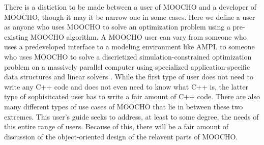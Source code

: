 \documentclass[pdf,ps2pdf,11pt]{SANDreport}
\begin{document}
There is a distiction to be made between a user of MOOCHO and a developer of
MOOCHO, though it may it be narrow one in some cases.  Here we define a user
as anyone who uses MOOCHO to solve an optimization problem using a
pre-existing MOOCHO algorithm.  A MOOCHO user can vary from someone who uses a
predeveloped interface to a modeling environment like AMPL
{}\cite{ref:ampl_1993} to someone who uses MOOCHO to solve a discrietized
simulation-constrained optimization problem on a massively parallel computer using
specialized application-specific data structures and linear solvers
{}\cite{ref:biros_1999}.  While the first type of user does not need to write
any C++ code and does not even need to know what C++ is, the latter type of
sophisitcated user has to write a fair amount of C++ code.  There are also
many different types of use cases of MOOCHO that lie in between these two
extremes.  This user's guide seeks to address, at least to some degree, the
needs of this entire range of users.  Because of this, there will be a fair
amount of discussion of the object-oriented design of the relavent parts of
MOOCHO.

%
%
\end{document}
